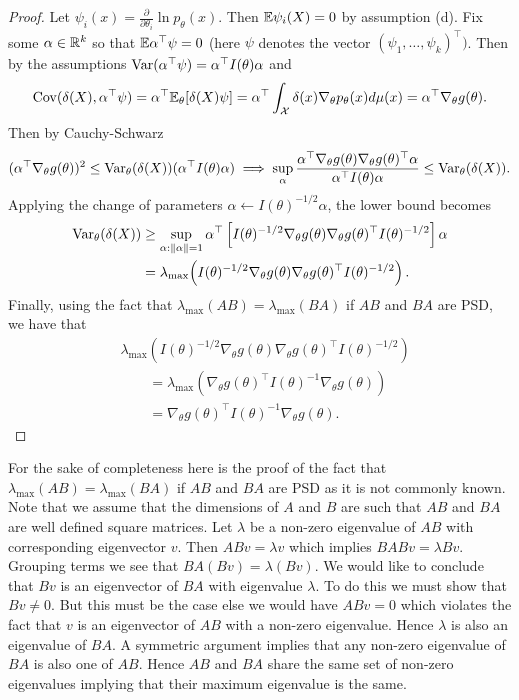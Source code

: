 \begin{proof}
Let $\psi_i(x) = \frac{\partial}{\partial\theta_i} \ln p_\theta(x)$. Then $\mathbb{E} \psi_i(X) = 0$ by assumption (d). Fix some $\alpha \in \mathbb{R}^k$ so that $\mathbb{E} \alpha^\top \psi = 0$ (here $\psi$ denotes the vector $(\psi_1, \dots, \psi_k)^\top)$. Then by the assumptions $\operatorname{Var}(\alpha^\top \psi) = \alpha^\top I(\theta) \alpha$ and $$
\operatorname{Cov}(\delta(X), \alpha^\top \psi) = \alpha^\top \mathbb{E}_\theta[\delta(X) \psi] = \alpha^\top \int_{\mathcal X} \delta(x) \nabla_\theta p_\theta(x) d\mu(x) = \alpha^\top \nabla_\theta g(\theta).
$$ Then by Cauchy-Schwarz \[
	(\alpha^\top \nabla_\theta g(\theta))^2 \leq \operatorname{Var}_\theta(\delta(X)) (\alpha^\top I(\theta) \alpha) \implies \sup_{\alpha} \frac{\alpha^\top \nabla_\theta g(\theta) \nabla_\theta g(\theta)^\top \alpha }{\alpha^\top I(\theta) \alpha} \le  \operatorname{Var}_\theta(\delta(X)).
	\] Applying the change of parameters $\alpha \leftarrow I(\theta)^{-1/2} \alpha$, the lower bound becomes
	\begin{align*}
	\operatorname{Var}_\theta(\delta(X))
	&\ge
	\sup_{\alpha:\|\alpha\|=1}
	\alpha^\top
	\left[
	I(\theta)^{-1/2}\nabla_\theta g(\theta)
	\nabla_\theta g(\theta)^\top I(\theta)^{-1/2}
	\right]\alpha \\
	&=
	\lambda_{\max}\!\left(
	I(\theta)^{-1/2}\nabla_\theta g(\theta)
	\nabla_\theta g(\theta)^\top I(\theta)^{-1/2}
	\right).
	\end{align*}
	Finally, using the fact that $\lambda_{\max}(AB) = \lambda_{\max}(BA)$ if $AB$ and $BA$ are PSD, we have that
	\begin{align*}
	&\lambda_{\max}\!\left(
	I(\theta)^{-1/2}\nabla_\theta g(\theta)
	\nabla_\theta g(\theta)^\top I(\theta)^{-1/2}
	\right) \\
	&\qquad=
	\lambda_{\max}\!\left(
	\nabla_\theta g(\theta)^\top I(\theta)^{-1}
	\nabla_\theta g(\theta)
	\right) \\
	&\qquad=
	\nabla_\theta g(\theta)^\top I(\theta)^{-1}
	\nabla_\theta g(\theta).
	\end{align*}
\end{proof}

\begin{remark}
For the sake of completeness here is the proof of the fact that $\lambda_{\text{max}}(AB) = \lambda_{\text{max}}(BA)$ if $AB$ and $BA$ are PSD as it is not commonly known. Note that we assume that the dimensions of $A$ and $B$ are such that $AB$ and $BA$ are well defined square matrices. Let $\lambda$ be a non-zero eigenvalue of $AB$ with corresponding eigenvector $v$. Then $ABv = \lambda v$ which implies $BABv = \lambda Bv$. Grouping terms we see that $BA(Bv) = \lambda (Bv)$. We would like to conclude that $Bv$ is an eigenvector of $BA$ with eigenvalue $\lambda$. To do this we must show that $Bv \neq 0$. But this must be the case else we would have $ABv = 0$ which violates the fact that $v$ is an eigenvector of $AB$ with a non-zero eigenvalue. Hence $\lambda$ is also an eigenvalue of $BA$. A symmetric argument implies that any non-zero eigenvalue of $BA$ is also one of $AB$. Hence $AB$ and $BA$ share the same set of non-zero eigenvalues implying that their maximum eigenvalue is the same.
\end{remark}

